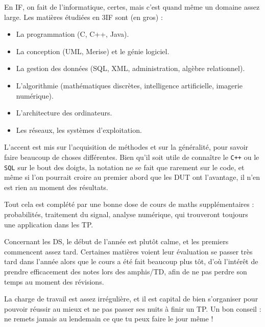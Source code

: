 En IF, on fait de l'informatique, certes, mais c'est quand même un domaine assez
large. Les matières étudiées en 3IF sont (en gros) :
\begin{itemize}
    \item La programmation (C, C++, Java).
    \item La conception (UML, Merise) et le génie logiciel.
    \item La gestion des données (SQL, XML, administration, algèbre relationnel).
    \item L'algorithmie (mathématiques discrètes, intelligence artificielle, imagerie numérique).
    \item L'architecture des ordinateurs.
    \item Les réseaux, les systèmes d'exploitation.
\end{itemize}

\vspace{1em}

L'accent est mis sur l'acquisition de méthodes et sur la généralité, pour savoir faire beaucoup
de choses différentes. Bien qu'il soit utile de connaître le \texttt{C++} ou le \texttt{SQL} sur le bout
des doigts, la notation ne se fait que rarement sur le code, et même si l'on pourrait croire au premier abord que les
DUT ont l'avantage, il n'en est rien au moment des résultats.

\vspace{1em}

Tout cela est complété par une bonne dose de cours de maths supplémentaires : probabilités,
traitement du signal, analyse numérique, qui trouveront toujours une application dans les TP.

\vspace{1em}

Concernant les DS, le début de l'année est plutôt calme, et les premiers
commencent assez tard. Certaines matières voient leur évaluation se
passer très tard dans l'année alors que le cours a été fait beaucoup plus tôt,
d'où l'intérêt de prendre efficacement des notes lors des amphis/TD, afin de ne
pas perdre son temps au moment des révisions.

\vspace{1em}

La charge de travail est assez irrégulière, et il est capital de bien s'organiser pour
pouvoir réussir au mieux et ne pas passer ses nuits à finir un TP. Un bon conseil : ne remets
jamais au lendemain ce que tu peux faire le jour même !
